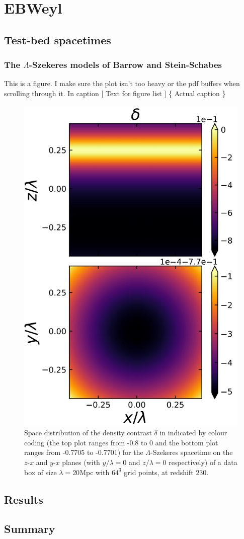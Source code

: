 \chapter{EBWeyl}
\label{sec: EBWeyl}

\section{Test-bed spacetimes} \label{sec: EBWeyl: Example spacetimes}

\subsection{The \texorpdfstring{$\Lambda$}{TEXT}-Szekeres models of Barrow and Stein-Schabes} \label{sec: EBWeyl: Ex Szekeres}

This is a figure. I make sure the plot isn't too heavy or the pdf buffers when scrolling through it. In caption [ Text for figure list ] \{ Actual caption \}

\begin{figure}[th!]
    \centering
    \includegraphics[width=0.5\linewidth]{plots/Paper1/Szekeresdelta.png}
    \caption[$\delta$ for the $\Lambda$-Szekeres spacetime]{Space distribution of the density contrast $\delta$ in  indicated by colour coding (the top plot ranges from -0.8 to 0 and the bottom plot ranges from -0.7705 to -0.7701) for the $\Lambda$-Szekeres spacetime on the $z$-$x$ and $y$-$x$ planes (with $y/\lambda=0$ and $z/\lambda=0$ respectively) of a data box of size $\lambda=20$Mpc with $64^3$ grid points, at redshift $230$.}
    \label{fig: Szekeres delta}
\end{figure}

\section{Results} \label{sec: EBWeyl: Results}

\section{Summary} \label{sec: EBWeyl: Conclusion}
